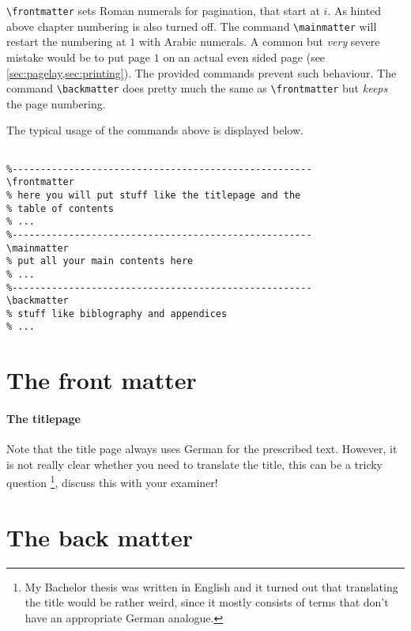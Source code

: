 \lstinline|\frontmatter| sets Roman numerals for pagination, that start at $i$. As hinted 
above chapter numbering is also turned off.
The command \lstinline|\mainmatter| will restart the numbering at $1$ with Arabic numerals. 
A common but \emph{very} severe mistake would be to put page $1$ on an actual even sided page 
(see \cref{sec:pagelay,sec:printing}). The provided commands prevent such behaviour.
The command \lstinline|\backmatter| does pretty much the same as \lstinline|\frontmatter| 
but \emph{keeps} the page numbering.
\begin{example}{}{}
The typical usage of the commands above is displayed below.
\begin{lstlisting}

%-----------------------------------------------------
\frontmatter
% here you will put stuff like the titlepage and the 
% table of contents
% ...
%-----------------------------------------------------
\mainmatter
% put all your main contents here
% ...
%-----------------------------------------------------
\backmatter
% stuff like biblography and appendices 
% ...

\end{lstlisting}	
\end{example}
\section{The front matter}\label{sec:front}
\paragraph{The titlepage} 
Note that the title page always uses German for the prescribed text. However, it is not 
really clear whether you need to translate the title, this can be a tricky question
\footnote{My Bachelor thesis was written in English and it turned out that translating 
the title would be rather weird, since it mostly consists of terms that don't have an 
appropriate German analogue.}, discuss this with your examiner!
\section{The back matter}\label{sec:back}
